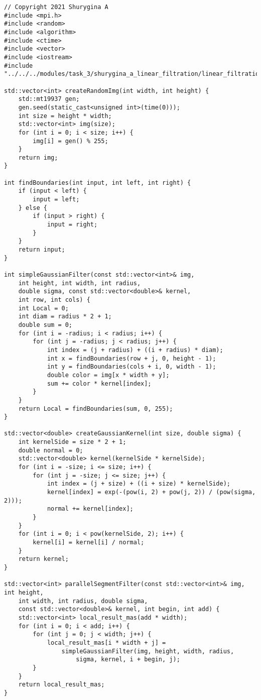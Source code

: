\documentclass{report}
\begin{document}
\begin{lstlisting}
// Copyright 2021 Shurygina A
#include <mpi.h>
#include <random>
#include <algorithm>
#include <ctime>
#include <vector>
#include <iostream>
#include "../../../modules/task_3/shurygina_a_linear_filtration/linear_filtration_block.h"

std::vector<int> createRandomImg(int width, int height) {
    std::mt19937 gen;
    gen.seed(static_cast<unsigned int>(time(0)));
    int size = height * width;
    std::vector<int> img(size);
    for (int i = 0; i < size; i++) {
        img[i] = gen() % 255;
    }
    return img;
}

int findBoundaries(int input, int left, int right) {
    if (input < left) {
        input = left;
    } else {
        if (input > right) {
            input = right;
        }
    }
    return input;
}

int simpleGaussianFilter(const std::vector<int>& img,
    int height, int width, int radius,
    double sigma, const std::vector<double>& kernel,
    int row, int cols) {
    int Local = 0;
    int diam = radius * 2 + 1;
    double sum = 0;
    for (int i = -radius; i < radius; i++) {
        for (int j = -radius; j < radius; j++) {
            int index = (j + radius) + ((i + radius) * diam);
            int x = findBoundaries(row + j, 0, height - 1);
            int y = findBoundaries(cols + i, 0, width - 1);
            double color = img[x * width + y];
            sum += color * kernel[index];
        }
    }
    return Local = findBoundaries(sum, 0, 255);
}

std::vector<double> createGaussianKernel(int size, double sigma) {
    int kernelSide = size * 2 + 1;
    double normal = 0;
    std::vector<double> kernel(kernelSide * kernelSide);
    for (int i = -size; i <= size; i++) {
        for (int j = -size; j <= size; j++) {
            int index = (j + size) + ((i + size) * kernelSide);
            kernel[index] = exp(-(pow(i, 2) + pow(j, 2)) / (pow(sigma, 2)));
            normal += kernel[index];
        }
    }
    for (int i = 0; i < pow(kernelSide, 2); i++) {
        kernel[i] = kernel[i] / normal;
    }
    return kernel;
}

std::vector<int> parallelSegmentFilter(const std::vector<int>& img, int height,
    int width, int radius, double sigma,
    const std::vector<double>& kernel, int begin, int add) {
    std::vector<int> local_result_mas(add * width);
    for (int i = 0; i < add; i++) {
        for (int j = 0; j < width; j++) {
            local_result_mas[i * width + j] =
                simpleGaussianFilter(img, height, width, radius,
                    sigma, kernel, i + begin, j);
        }
    }
    return local_result_mas;
}


\end{lstlisting}
\end{document}
